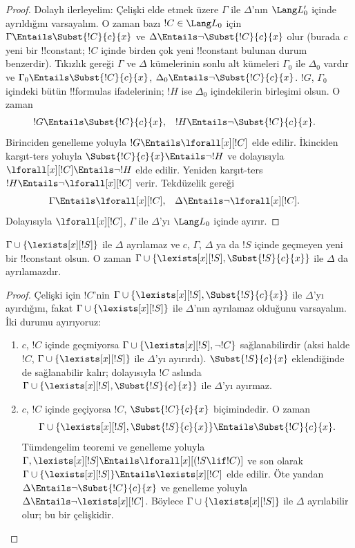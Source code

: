 \begin{proof}
Dolaylı ilerleyelim: Çelişki elde etmek üzere $\Gamma$ ile $\Delta$'nın
$\Lang L'_0$ içinde ayrıldığını varsayalım. O zaman bazı
$!C\in\Lang L_0$ için
$\Gamma\Entails\Subst{!C}{c}{x}$ ve
$\Delta\Entails\lnot\Subst{!C}{c}{x}$ olur (burada $c$ yeni bir
!!{constant}; $!C$ içinde birden çok yeni !!{constant} bulunan durum
benzerdir). Tıkızlık gereği $\Gamma$ ve $\Delta$ kümelerinin sonlu alt
kümeleri $\Gamma_0$ ile $\Delta_0$ vardır ve
$\Gamma_0\Entails\Subst{!C}{c}{x}$,
$\Delta_0\Entails\lnot\Subst{!C}{c}{x}$. $!G$, $\Gamma_0$ içindeki
bütün !!{formula}s ifadelerinin; $!H$ ise $\Delta_0$ içindekilerin
birleşimi olsun. O zaman
\begin{align*}
  !G & \Entails \Subst{!C}{c}{x}, &
  !H & \Entails \lnot \Subst{!C}{c}{x}.
\end{align*}
Birinciden genelleme yoluyla $!G\Entails\lforall[x][!C]$ elde edilir.
İkinciden karşıt-ters yoluyla
$\Subst{!C}{c}{x}\Entails\lnot !H$ ve dolayısıyla
$\lforall[x][!C]\Entails\lnot !H$ elde edilir. Yeniden karşıt-ters
$!H\Entails\lnot\lforall[x][!C]$ verir. Tekdüzelik gereği
\begin{align*}
  \Gamma &\Entails \lforall[x][!C], &
  \Delta &\Entails \lnot \lforall[x][!C].
\end{align*}
Dolayısıyla $\lforall[x][!C]$, $\Gamma$ ile $\Delta$'yı
$\Lang L_0$ içinde ayırır.
\end{proof}

\begin{lem}
$\Gamma\cup\{\lexists[x][!S]\}$ ile $\Delta$ ayrılamaz ve $c$,
$\Gamma$, $\Delta$ ya da $!S$ içinde geçmeyen yeni bir !!{constant}
olsun. O zaman
$\Gamma\cup\{\lexists[x][!S],\Subst{!S}{c}{x}\}$ ile $\Delta$ da
ayrılamazdır.
\end{lem}

\begin{proof}
Çelişki için $!C$'nin
$\Gamma\cup\{\lexists[x][!S],\Subst{!S}{c}{x}\}$ ile $\Delta$'yı
ayırdığını, fakat $\Gamma\cup\{\lexists[x][!S]\}$ ile $\Delta$'nın
ayrılamaz olduğunu varsayalım. İki durumu ayırıyoruz:
\begin{enumerate}
\item $c$, $!C$ içinde geçmiyorsa
  $\Gamma\cup\{\lexists[x][!S],\lnot !C\}$ sağlanabilirdir (aksi halde
  $!C$, $\Gamma\cup\{\lexists[x][!S]\}$ ile $\Delta$'yı ayırırdı).
  $\Subst{!S}{c}{x}$ eklendiğinde de sağlanabilir kalır; dolayısıyla
  $!C$ aslında
  $\Gamma\cup\{\lexists[x][!S],\Subst{!S}{c}{x}\}$ ile $\Delta$'yı
  ayırmaz.
\item $c$, $!C$ içinde geçiyorsa $!C$, $\Subst{!C}{c}{x}$ biçimindedir.
  O zaman
  \[
  \Gamma \cup \{ \lexists[x][!S], \Subst{!S}{c}{x}\}
  \Entails \Subst{!C}{c}{x}.
  \]
  Tümdengelim teoremi ve genelleme yoluyla
  $\Gamma,\lexists[x][!S]\Entails\lforall[x][(!S\lif !C)]$ ve son
  olarak
  $\Gamma\cup\{\lexists[x][!S]\}\Entails\lexists[x][!C]$ elde edilir.
  Öte yandan $\Delta\Entails\lnot\Subst{!C}{c}{x}$ ve genelleme
  yoluyla $\Delta\Entails\lnot\lexists[x][!C]$. Böylece
  $\Gamma\cup\{\lexists[x][!S]\}$ ile $\Delta$ ayrılabilir olur; bu
  bir çelişkidir.
\end{enumerate}
\end{proof}

